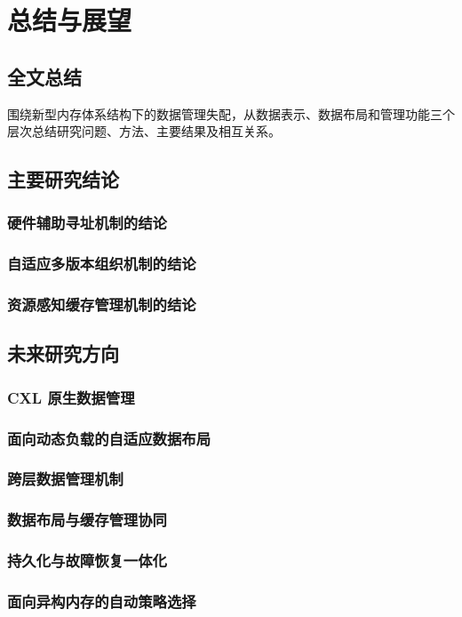 \chapter{总结与展望}

\section{全文总结}
围绕新型内存体系结构下的数据管理失配，从数据表示、数据布局和管理功能三个层次总结研究问题、方法、主要结果及相互关系。
\section{主要研究结论}
\subsection{硬件辅助寻址机制的结论}
\subsection{自适应多版本组织机制的结论}
\subsection{资源感知缓存管理机制的结论}
\section{未来研究方向}
\subsection{CXL 原生数据管理}
\subsection{面向动态负载的自适应数据布局}
\subsection{跨层数据管理机制}
\subsection{数据布局与缓存管理协同}
\subsection{持久化与故障恢复一体化}
\subsection{面向异构内存的自动策略选择}
